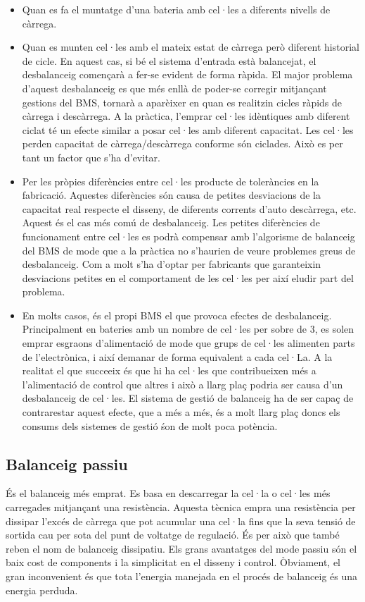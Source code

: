 \begin{itemize}
    \item Quan es fa el muntatge d'una bateria amb cel·les a diferents nivells de càrrega.
    
    \item Quan es munten cel·les amb el mateix estat de càrrega però diferent historial de cicle. En aquest cas, si bé el sistema d'entrada està balancejat, el desbalanceig començarà a fer-se evident de forma ràpida. El major problema d'aquest desbalanceig es que més enllà de poder-se corregir mitjançant gestions del BMS, tornarà a aparèixer en quan es realitzin cicles ràpids de càrrega i descàrrega. A la pràctica, \newline l'emprar cel·les idèntiques amb diferent ciclat té un efecte similar a posar cel·les amb diferent capacitat. Les cel·les perden capacitat de càrrega/descàrrega conforme són ciclades. Això es per tant un factor que s'ha d'evitar.
    
    \item Per les pròpies diferències entre cel·les producte de toleràncies en la fabricació. Aquestes diferències són causa de petites desviacions de la capacitat real respecte el disseny, de diferents corrents d'auto descàrrega, etc. Aquest és el cas més comú de desbalanceig. Les petites diferències de funcionament entre cel·les es podrà compensar amb l'algorisme de balanceig del BMS de mode que a la pràctica no s'haurien de veure problemes greus de desbalanceig. Com a molt s'ha d'optar per fabricants que garanteixin desviacions petites en el comportament de les cel·les per així eludir part del problema.
    
    \item En molts casos, és el propi BMS el que provoca efectes de desbalanceig. Principalment en bateries amb un nombre de cel·les per sobre de 3, es solen emprar esgraons d'alimentació de mode que grups de cel·les alimenten parts de l'electrònica, i així demanar de forma equivalent a cada cel·La. A la realitat el que succeeix és que hi ha cel·les que contribueixen més a l'alimentació de control que altres i això a llarg plaç podria ser causa d'un desbalanceig de cel·les. El sistema de gestió de balanceig ha de ser capaç de contrarestar aquest efecte, que a més a més, és a molt llarg plaç doncs els consums dels sistemes de gestió śon de molt poca potència.
\end{itemize}

\subsection{Balanceig passiu}
És el balanceig més emprat. Es basa en descarregar la cel·la o cel·les més carregades mitjançant una resistència. Aquesta tècnica empra una \newline resistència per dissipar l'excés de càrrega que pot acumular una cel·la fins que la seva tensió de sortida cau per sota del punt de voltatge de regulació. És per això que també reben el nom de balanceig dissipatiu. Els grans avantatges del mode passiu són el baix cost de components i la simplicitat en el disseny i control. Òbviament, el gran inconvenient és que tota l'energia manejada en el procés de balanceig és una energia perduda.

